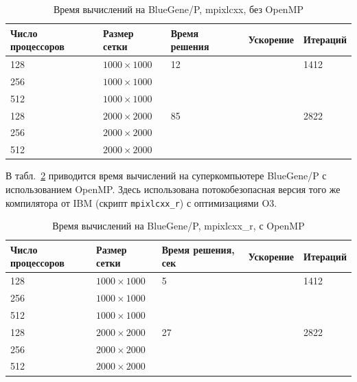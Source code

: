 \documentclass[12pt,notitlepage,oneside]{extarticle}
\begin{document}
\begin{table}[h]
\centering
\caption{Время вычислений на BlueGene/P, mpixlcxx, без OpenMP}
\label{bg:table}
\begin{tabular}{|l|l|l|l|l|}
\textbf{Число процессоров} & \textbf{Размер сетки} & \textbf{Время решения} & \textbf{Ускорение}      & \textbf{Итераций}        \\ \hline
128                        & $1000 \times 1000 $        & 12                     &                    & 1412                     \\
256                        & $1000 \times 1000 $        &                        &                    &                          \\
512                        & $1000 \times 1000 $        &                        &                    &                          \\ \hline
128                        & $2000 \times 2000 $        & 85                     &                    & 2822                     \\
256                        & $2000 \times 2000 $        &                        &                    &                          \\
512                        & $2000 \times 2000 $        &                        &                    &
\end{tabular}
\end{table}

В табл.~\ref{bg_omp:table} приводится время вычислений на суперкомпьютере
BlueGene/P с использованием OpenMP. Здесь использована потокобезопасная версия
того же компилятора от IBM (скрипт \texttt{mpixlcxx\_r}) с оптимизациями O3.

\begin{table}[h]
\centering
\caption{Время вычислений на BlueGene/P, mpixlcxx\_r, с OpenMP}
\label{bg_omp:table}
\begin{tabular}{|l|l|l|l|l|}
\textbf{Число процессоров} & \textbf{Размер сетки} & \textbf{Время решения, сек} & \textbf{Ускорение}  & \textbf{Итераций}        \\ \hline
128                        & $1000 \times 1000 $        & 5                      &                     & 1412                     \\
256                        & $1000 \times 1000 $        &                        &                     &                          \\
512                        & $1000 \times 1000 $        &                        &                     &                          \\ \hline
128                        & $2000 \times 2000 $        & 27                     &                     & 2822                     \\
256                        & $2000 \times 2000 $        &                        &                     &                          \\
512                        & $2000 \times 2000 $        &                        &                     &
\end{tabular}
\end{table}
\end{document}
